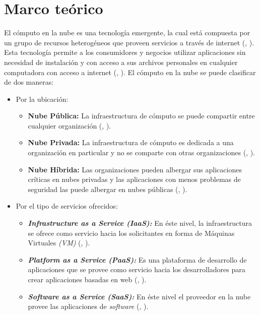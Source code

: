 \section{Marco te\'orico}

El c\'omputo en la nube es una tecnolog\'ia emergente, la cual est\'a compuesta por un grupo de recursos heterog\'eneos que proveen servicios a trav\'es de internet (\citeauthor{agarwal2014efficient}, \citeyear{agarwal2014efficient}).
Esta tecnolog\'ia permite a los consumidores y negocios utilizar aplicaciones sin necesidad de instalaci\'on y con acceso a sus archivos personales en cualquier computadora con acceso a internet (\citeauthor{ahmed2012advanced}, \citeyear{ahmed2012advanced}). 
El c\'omputo en la nube se puede clasificar de dos maneras:
\begin{itemize}
	\item Por la ubicaci\'on: 
	\begin{itemize}
		\item \textbf{Nube P\'ublica:} La infraestructura de c\'omputo se puede compartir entre cualquier organizaci\'on (\citeauthor{ahmed2012advanced}, \citeyear{ahmed2012advanced}).
		\item \textbf{Nube Privada:} La infraestructura de c\'omputo es dedicada a una organizaci\'on en particular y no se comparte con otras organizaciones (\citeauthor{ahmed2012advanced}, \citeyear{ahmed2012advanced}).
		\item \textbf{Nube H\'ibrida:} Las organizaciones pueden albergar sus aplicaciones cr\'iticas en nubes privadas y las aplicaciones con menos problemas de seguridad las puede albergar en nubes p\'ublicas (\citeauthor{ahmed2012advanced}, \citeyear{ahmed2012advanced}).
	\end{itemize}
	\item Por el tipo de servicios ofrecidos: 
	\begin{itemize}
		\item \textit{\textbf{Infrastructure as a Service (IaaS):}} En \'este nivel, la infraestructura se ofrece como servicio hacia los solicitantes en forma de M\'aquinas Virtuales \textit{(VM)} (\citeauthor{agarwal2014efficient}, \citeyear{agarwal2014efficient}).
		\item \textit{\textbf{Platform as a Service (PaaS):}} Es una plataforma de desarrollo de aplicaciones que se provee como servicio hacia los desarrolladores para crear aplicaciones basadas en web (\citeauthor{agarwal2014efficient}, \citeyear{agarwal2014efficient}).
		\item \textit{\textbf{Software as a Service (SaaS):}} En \'este nivel el proveedor en la nube provee las aplicaciones de \textit{software} (\citeauthor{agarwal2014efficient}, \citeyear{agarwal2014efficient}).
	\end{itemize}
\end{itemize}


